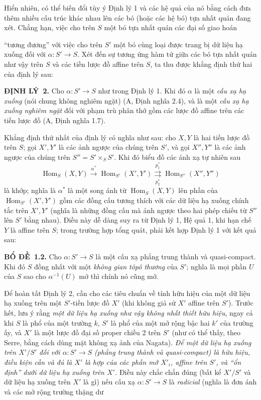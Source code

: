 \documentclass[11pt,twoside,openany]{book}
\numberwithin{equation}{section}
\newcommand{\src}[1]{%
  \phantomsection\hypertarget{src:\fgasourceid:#1}{}%
  \marginpar{\raggedleft\footnotesize\sffamily #1}%
}
\newcommand{\fgasourceid}{unset}
\newcommand{\result}[2]{\par\medskip\noindent\textbf{#1\if\relax\detokenize{#2}\relax\else\ #2\fi.}\quad}
\begin{document}
Hiển nhiên, có thể biến đổi tùy ý Định lý 1 và các hệ quả của nó bằng cách đưa
thêm nhiều cấu trúc khác nhau lên các bó (hoặc các hệ bó) tựa nhất quán đang
xét. Chẳng hạn, việc cho trên $S$ một bó tựa nhất quán các đại số giao hoán

\src{317}
``tương đương'' với việc cho trên $S'$ một bó cùng loại được trang bị dữ liệu
hạ xuống đối với $\alpha:S'\longrightarrow S$. Xét đến sự tương ứng hàm tử
giữa các bó tựa nhất quán như vậy trên $S$ và các tiền lược đồ affine trên $S$,
ta thu được khẳng định thứ hai của định lý sau:

\result{ĐỊNH LÝ}{2} Cho $\alpha:S'\longrightarrow S$ như trong Định lý 1. Khi
đó $\alpha$ là một \emph{cấu xạ hạ xuống} (nói chung không nghiêm ngặt)
(A, Định nghĩa 2.4), và là một \emph{cấu xạ hạ xuống nghiêm ngặt} đối với phạm
trù phân thớ gồm các lược đồ affine trên các tiền lược đồ (A, Định nghĩa 1.7).

Khẳng định thứ nhất của định lý có nghĩa như sau: cho $X,Y$ là hai tiền lược đồ
trên $S$; gọi $X',Y'$ là các ảnh ngược của chúng trên $S'$, và gọi $X'',Y''$
là các ảnh ngược của chúng trên $S''=S'\times_SS'$. Khi đó biểu đồ các ánh xạ
tự nhiên sau
\[
  \operatorname{Hom}_S(X,Y)\xrightarrow{\alpha^*}
  \operatorname{Hom}_{S'}(X',Y')
  \underset{p_2^*}{\overset{p_1^*}{\rightrightarrows}}
  \operatorname{Hom}_{S''}(X'',Y'')
\]
là khớp; nghĩa là $\alpha^*$ là một song ánh từ
$\operatorname{Hom}_S(X,Y)$ lên phần của $\operatorname{Hom}_{S'}(X',Y')$ gồm
các đồng cấu tương thích với các dữ liệu hạ xuống chính tắc trên $X',Y'$ (nghĩa
là những đồng cấu mà ảnh ngược theo hai phép chiếu từ $S''$ lên $S'$ bằng
nhau). Điều này dễ dàng suy ra từ Định lý 1, Hệ quả 1, khi hạn chế $Y$ là affine
trên $S$; trong trường hợp tổng quát, phải kết hợp Định lý 1 với kết quả sau:

\result{BỔ ĐỀ}{1.2} Cho $\alpha:S'\longrightarrow S$ là một cấu xạ phẳng trung
thành và quasi-compact. Khi đó $S$ đồng nhất với một \emph{không gian tôpô
thương} của $S'$; nghĩa là mọi phần $U$ của $S$ sao cho $\alpha^{-1}(U)$ mở thì
chính nó cũng mở.

Để hoàn tất Định lý 2, cần cho các tiêu chuẩn về tính hữu hiệu của một dữ liệu
hạ xuống trên một $S'$-tiền lược đồ $X'$ (khi không giả sử $X'$ affine trên
$S'$). Trước hết, lưu ý rằng \emph{một dữ liệu hạ xuống như vậy không nhất
thiết hữu hiệu}, ngay cả khi $S$ là phổ của một trường $k$, $S'$ là phổ của một
mở rộng bậc hai $k'$ của trường ấy, và $X'$ là một lược đồ đại số proper chiều 2 trên
$S'$ (như có thể thấy, theo Serre, bằng cách dùng mặt không xạ ảnh của Nagata).
\emph{Để một dữ liệu hạ xuống trên $X'/S'$ đối với
$\alpha:S'\longrightarrow S$ (phẳng trung thành và quasi-compact) là hữu hiệu,
điều kiện cần và đủ là $X'$ là hợp của các phần mở $X'_i$, affine trên $S'$, và
``ổn định'' dưới dữ liệu hạ xuống trên $X'$.} Điều này chắc chắn đúng (bất kể
$X'/S'$ và dữ liệu hạ xuống trên $X'$ là gì) nếu cấu xạ
$\alpha:S'\longrightarrow S$ là \emph{radicial} (nghĩa là đơn ánh và các mở
rộng trường thặng dư
\end{document}
